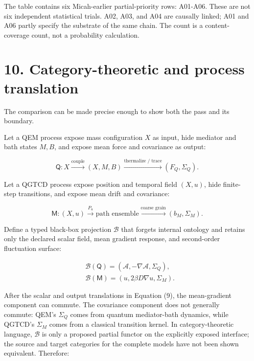 \documentclass[
  american,
  11pt,
  letterpaper,
]{article}
\begin{document}
The table contains six Micah-earlier partial-priority rows: A01-A06. These are not six independent statistical trials. A02, A03, and A04 are causally linked; A01 and A06 partly specify the substrate of the same chain. The count is a content-coverage count, not a probability calculation.

\section{10. Category-theoretic and process translation}\label{category-theoretic-and-process-translation}

The comparison can be made precise enough to show both the pass and its boundary.

Let a QEM process expose mass configuration \(X\) as input, hide mediator and bath states \(M,B\), and expose mean force and covariance as output:

\begin{equation}
\mathsf{Q}: X
\xrightarrow{\text{couple}}
(X,M,B)
\xrightarrow{\text{thermalize / trace}}
(F_Q,\Sigma_Q).
\tag{11}
\end{equation}

Let a QGTCD process expose position and temporal field \((X,u)\), hide finite-step transitions, and expose mean drift and covariance:

\begin{equation}
\mathsf{M}: (X,u)
\xrightarrow{P_u}
\text{path ensemble}
\xrightarrow{\text{coarse grain}}
(b_M,\Sigma_M).
\tag{12}
\end{equation}

Define a typed black-box projection \(\mathcal{B}\) that forgets internal ontology and retains only the declared scalar field, mean gradient response, and second-order fluctuation surface:

\begin{equation}
\begin{aligned}
& \mathcal{B}(\mathsf{Q})=(\mathcal{A},-\nabla\mathcal{A},\Sigma_Q), \\
& \mathcal{B}(\mathsf{M})=(u,2\beta D\nabla u,\Sigma_M).
\end{aligned}
\tag{13}
\end{equation}

After the scalar and output translations in Equation (9), the mean-gradient component can commute. The covariance component does not generally commute: QEM's \(\Sigma_Q\) comes from quantum mediator-bath dynamics, while QGTCD's \(\Sigma_M\) comes from a classical transition kernel. In category-theoretic language, \(\mathcal{B}\) is only a proposed partial functor on the explicitly exposed interface; the source and target categories for the complete models have not been shown equivalent. Therefore:
\end{document}
